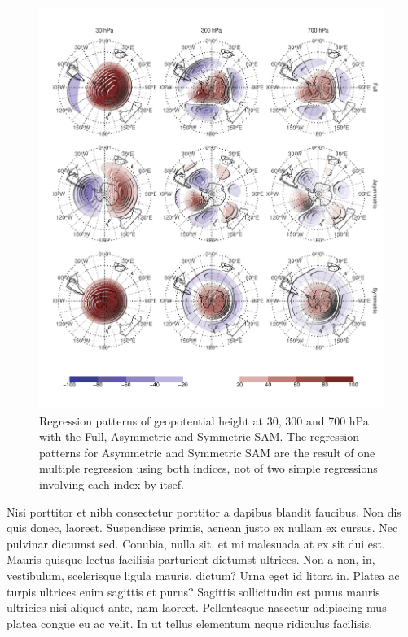 \documentclass[twocol]{ametsocV5}
\begin{document}
\begin{figure}
\includegraphics{2d-regr-1} \caption[Regression patterns of geopotential height at 30, 300 and 700 hPa with the Full, Asymmetric and Symmetric SAM]{Regression patterns of geopotential height at 30, 300 and 700 hPa with the Full, Asymmetric and Symmetric SAM. The regression patterns for Asymmetric and Symmetric SAM are the result of one multiple regression using both indices, not of two simple regressions involving each index by itsef.}\label{fig:2d-regr}
\end{figure}

Nisi porttitor et nibh consectetur porttitor a dapibus blandit faucibus.
Non dis quis donec, laoreet. Suspendisse primis, aenean justo ex nullam
ex cursus. Nec pulvinar dictumst sed. Conubia, nulla sit, et mi
malesuada at ex sit dui est. Mauris quisque lectus facilisis parturient
dictumst ultrices. Non a non, in, vestibulum, scelerisque ligula mauris,
dictum? Urna eget id litora in. Platea ac turpis ultrices enim sagittis
et purus? Sagittis sollicitudin est purus mauris ultricies nisi aliquet
ante, nam laoreet. Pellentesque nascetur adipiscing mus platea congue eu
ac velit. In ut tellus elementum neque ridiculus facilisis.
\end{document}
